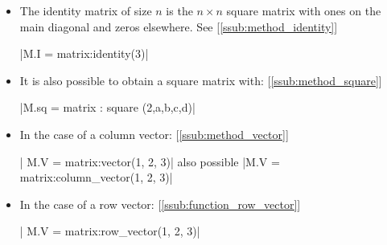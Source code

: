 \begin{itemize}
\begin{tkzexample}[latex=.5\textwidth]
\end{tkzexample}


\item  The identity matrix of size
{$\displaystyle n$} is the {$\displaystyle n\times n$} square matrix with ones on the main diagonal and zeros elsewhere. See  [\ref{ssub:method_identity}]

\begin{mybox}
|M.I = matrix:identity(3)|
\end{mybox}


\begin{tkzexample}[latex=.5\textwidth]
\end{tkzexample}


\item  It is also possible to obtain a square matrix with: [\ref{ssub:method_square}]
  \begin{mybox}
  |M.sq = matrix : square (2,a,b,c,d)|
  \end{mybox}

\begin{tkzexample}[latex=.5\textwidth]
\end{tkzexample}


\item  In the case of a column vector: [\ref{ssub:method_vector}]

  \begin{mybox}
  | M.V = matrix:vector(1, 2, 3)|
  also possible |M.V = matrix:column_vector(1, 2, 3)|
  \end{mybox}


\begin{tkzexample}[latex=.5\textwidth]
\end{tkzexample}


\item  In the case of a row vector: [\ref{ssub:function_row_vector}]

\begin{mybox}
  | M.V = matrix:row_vector(1, 2, 3)|
\end{mybox}


\end{itemize}
